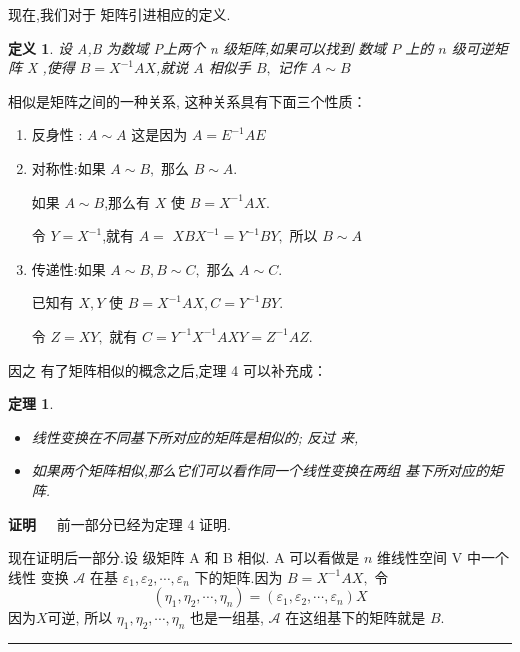 \documentclass[13pt]{beamer}
\newtheorem{thm}{定理}
\newtheorem*{defi}{定义}
\def\qed{\nopagebreak\hfill{\rule{4pt}{7pt}}\medbreak}
\def\pf{{\bf 证明~~ }}
\def\A{\mathscr{A}}
\begin{document}
 
\begin{frame}
现在,我们对于 矩阵引进相应的定义. 
\begin{defi}
 设 A,B 为数域 P上两个 n 级矩阵,如果可以找到 数域 $P$ 上的 $n$ 级可逆矩阵 X ,使得 ${B}={X}^{-1} {A X}$,就说 ${A}$ 相似手
${B},$ 记作 ${A} \sim {B}$
\end{defi}
相似是矩阵之间的一种关系, 这种关系具有下面三个性质：
\begin{enumerate}
	\item 反身性 : $A \sim A$ 这是因为 ${A}={E}^{-1} {A} {E}$
	\item 对称性:如果 ${A} \sim {B},$ 那么 ${B} \sim {A}$.
	
	如果 ${A} \sim {B}$,那么有 ${X}$ 使 ${B}={X}^{-1} {A} {X}$.
	
	令 ${Y}={X}^{-1}$,就有 ${A}=$
	${X B X}^{-1} = {Y}^{-1} {B Y},$ 所以 ${B} \sim {A}$
	\item 传递性:如果 ${A} \sim {B}, {B} \sim {C},$ 那么 ${A} \sim {C}$.
	
	已知有 ${X}, {Y}$ 使 ${B}={X}^{-1} {A} {X}, {C}={Y}^{-1} {B} {Y}$.
	
	令 ${Z}={X} {Y},$ 就有
	${C}={Y}^{-1} {X}^{-1} {A} {X} {Y}={Z}^{-1} {A} {Z}$. 
\end{enumerate}

\end{frame}

\begin{frame}
因之
有了矩阵相似的概念之后,定理 4 可以补充成： 
\begin{thm}
\begin{itemize}
	\item 线性变换在不同基下所对应的矩阵是相似的; 反过
	来,
	\item 如果两个矩阵相似,那么它们可以看作同一个线性变换在两组 基下所对应的矩阵. 
\end{itemize}
\end{thm}

\pf  前一部分已经为定理 4 证明.

现在证明后一部分.设 级矩阵 A 和 B 相似. A 可以看做是 $n$ 维线性空间 V 中一个线性 变换 $\A$ 在基 ${\varepsilon}_{1}, {\varepsilon}_{2}, \cdots, {\varepsilon}_{n}$ 下的矩阵.因为 ${B}={X}^{-1} {A} {X},$ 令
\[
\left({\eta}_{1}, {\eta}_{2}, \cdots, {\eta}_{n}\right)=\left({\varepsilon}_{1}, {\varepsilon}_{2}, \cdots, {\varepsilon}_{n}\right) {X}
\]
因为$X$可逆, 所以 ${\eta}_{1}, {\eta}_{2}, \cdots, {\eta}_{n}$ 也是一组基, $\A$ 在这组基下的矩阵就是 ${B}$. \qed
\end{frame}
\end{document}

